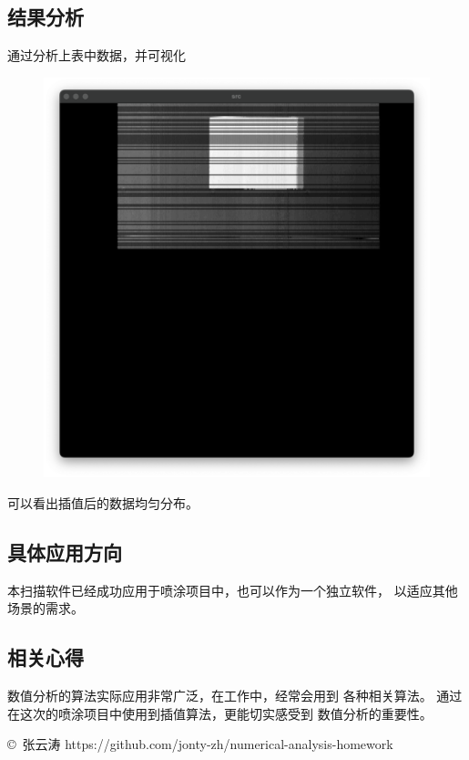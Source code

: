 \documentclass{article}
\begin{document}
\subsection{结果分析}
通过分析上表中数据，并可视化
\begin{figure}[H]
    \centering
    \includegraphics[width=.5\textwidth]{相关资源/图片/题目5扫描结果分析.png} 
\end{figure}
可以看出插值后的数据均匀分布。

\subsection{具体应用方向}
本扫描软件已经成功应用于喷涂项目中，也可以作为一个独立软件，
以适应其他场景的需求。

\subsection{相关心得}
数值分析的算法实际应用非常广泛，在工作中，经常会用到
各种相关算法。
通过在这次的喷涂项目中使用到插值算法，更能切实感受到
数值分析的重要性。

\vspace*{2cm}
\copyright~张云涛 https://github.com/jonty-zh/numerical-analysis-homework
\end{document}
